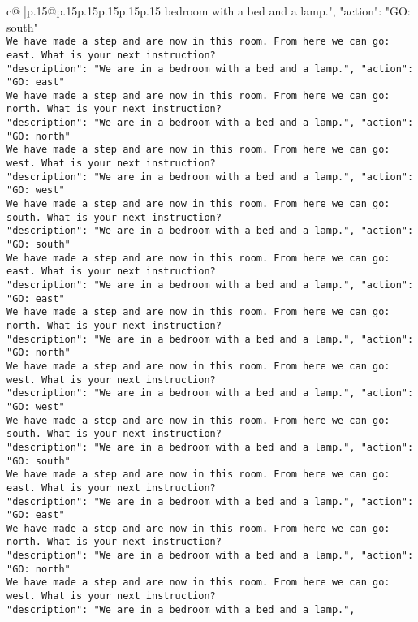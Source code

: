 \documentclass{article}
\begin{document}
{\begin{supertabular}{c@{$\;$}|p{.15\linewidth}@{}p{.15\linewidth}p{.15\linewidth}p{.15\linewidth}p{.15\linewidth}p{.15\linewidth}}
{{{bedroom with a bed and a lamp.", "action": "GO: south"}\\ \tt We have made a step and are now in this room. From here we can go: east. What is your next instruction?\\ \tt {"description": "We are in a bedroom with a bed and a lamp.", "action": "GO: east"}\\ \tt We have made a step and are now in this room. From here we can go: north. What is your next instruction?\\ \tt {"description": "We are in a bedroom with a bed and a lamp.", "action": "GO: north"}\\ \tt We have made a step and are now in this room. From here we can go: west. What is your next instruction?\\ \tt {"description": "We are in a bedroom with a bed and a lamp.", "action": "GO: west"}\\ \tt We have made a step and are now in this room. From here we can go: south. What is your next instruction?\\ \tt {"description": "We are in a bedroom with a bed and a lamp.", "action": "GO: south"}\\ \tt We have made a step and are now in this room. From here we can go: east. What is your next instruction?\\ \tt {"description": "We are in a bedroom with a bed and a lamp.", "action": "GO: east"}\\ \tt We have made a step and are now in this room. From here we can go: north. What is your next instruction?\\ \tt {"description": "We are in a bedroom with a bed and a lamp.", "action": "GO: north"}\\ \tt We have made a step and are now in this room. From here we can go: west. What is your next instruction?\\ \tt {"description": "We are in a bedroom with a bed and a lamp.", "action": "GO: west"}\\ \tt We have made a step and are now in this room. From here we can go: south. What is your next instruction?\\ \tt {"description": "We are in a bedroom with a bed and a lamp.", "action": "GO: south"}\\ \tt We have made a step and are now in this room. From here we can go: east. What is your next instruction?\\ \tt {"description": "We are in a bedroom with a bed and a lamp.", "action": "GO: east"}\\ \tt We have made a step and are now in this room. From here we can go: north. What is your next instruction?\\ \tt {"description": "We are in a bedroom with a bed and a lamp.", "action": "GO: north"}\\ \tt We have made a step and are now in this room. From here we can go: west. What is your next instruction?\\ \tt {"description": "We are in a bedroom with a bed and a lamp.", }}}
\end{supertabular}}
\end{document}
